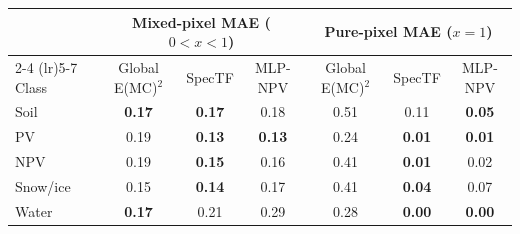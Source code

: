 \begin{tabular}{l ccc ccc}
\toprule
 & \multicolumn{3}{c}{Mixed-pixel MAE ($0<x<1$)} & \multicolumn{3}{c}{Pure-pixel MAE ($x=1$)} \\
\cmidrule(lr){2-4} \cmidrule(lr){5-7}
Class & Global E(MC)$^2$ & SpecTF & MLP-NPV & Global E(MC)$^2$ & SpecTF & MLP-NPV \\
\midrule
Soil & \textbf{0.17} & \textbf{0.17} & 0.18 & 0.51 & 0.11 & \textbf{0.05} \\
PV & 0.19 & \textbf{0.13} & \textbf{0.13} & 0.24 & \textbf{0.01} & \textbf{0.01} \\
NPV & 0.19 & \textbf{0.15} & 0.16 & 0.41 & \textbf{0.01} & 0.02 \\
Snow/ice & 0.15 & \textbf{0.14} & 0.17 & 0.41 & \textbf{0.04} & 0.07 \\
Water & \textbf{0.17} & 0.21 & 0.29 & 0.28 & \textbf{0.00} & \textbf{0.00} \\
\bottomrule
\end{tabular}
